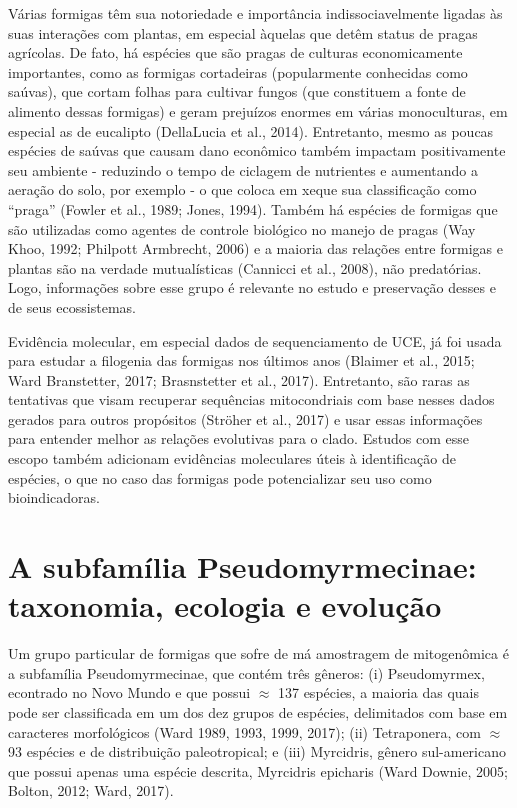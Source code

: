 \documentclass[../DISSERTACAO_MAIN.tex]{subfiles}
\begin{document}
Várias formigas têm sua notoriedade e importância indissociavelmente ligadas às suas interações com plantas, em especial àquelas que detêm status de pragas agrícolas. De fato, há espécies que são pragas de culturas economicamente importantes, como as formigas cortadeiras (popularmente conhecidas como saúvas), que cortam folhas para cultivar fungos (que constituem a fonte de alimento dessas formigas) e geram prejuízos enormes em várias monoculturas, em especial as de eucalipto (DellaLucia et al., 2014). Entretanto, mesmo as poucas espécies de saúvas que causam dano econômico também impactam positivamente seu ambiente - reduzindo o tempo de ciclagem de nutrientes e aumentando a aeração do solo, por exemplo -  o que coloca em xeque sua classificação como “praga” (Fowler et al., 1989; Jones, 1994). Também há espécies de formigas que são utilizadas como agentes de controle biológico no manejo de pragas (Way  Khoo, 1992; Philpott  Armbrecht, 2006) e a maioria das relações entre formigas e plantas são na verdade mutualísticas (Cannicci et al., 2008), não predatórias. Logo, informações sobre esse grupo é relevante no estudo e preservação desses e de seus ecossistemas.

Evidência molecular, em especial dados de sequenciamento de UCE, já foi usada para estudar a filogenia das formigas nos últimos anos (Blaimer et al., 2015; Ward  Branstetter, 2017; Brasnstetter et al., 2017). Entretanto, são raras as tentativas que visam recuperar sequências mitocondriais com base nesses dados gerados para outros propósitos (Ströher et al., 2017) e usar essas informações para entender melhor as relações evolutivas para o clado. Estudos com esse escopo também adicionam evidências moleculares úteis à identificação de espécies, o que no caso das formigas pode potencializar seu uso como bioindicadoras.

\section{A subfamília Pseudomyrmecinae: taxonomia, ecologia e evolução}

Um grupo particular de formigas que sofre de má amostragem de mitogenômica é a subfamília Pseudomyrmecinae, que contém três gêneros: (i) Pseudomyrmex, econtrado no Novo Mundo e que possui $\approx$ 137 espécies, a maioria das quais pode ser classificada em um dos dez grupos de espécies, delimitados com base em caracteres morfológicos (Ward 1989, 1993, 1999, 2017); (ii) Tetraponera, com $\approx$ 93 espécies e de distribuição paleotropical; e (iii) Myrcidris, gênero sul-americano que possui apenas uma espécie descrita, Myrcidris epicharis (Ward  Downie, 2005; Bolton, 2012; Ward, 2017).
\end{document}
